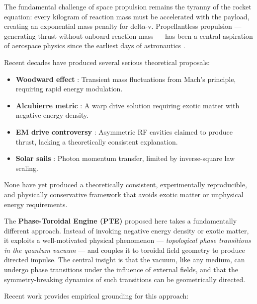 \documentclass[12pt,a4paper]{article}
\begin{document}
The fundamental challenge of space propulsion remains the tyranny of the rocket equation: every kilogram of reaction mass must be accelerated with the payload, creating an exponential mass penalty for delta-v. Propellantless propulsion --- generating thrust without onboard reaction mass --- has been a central aspiration of aerospace physics since the earliest days of astronautics \cite{tsiolkovsky1903, goddard1919}.

Recent decades have produced several serious theoretical proposals:

\begin{itemize}
    \item \textbf{Woodward effect} \cite{woodward1990}: Transient mass fluctuations from Mach's principle, requiring rapid energy modulation.
    \item \textbf{Alcubierre metric} \cite{alcubierre1994}: A warp drive solution requiring exotic matter with negative energy density.
    \item \textbf{EM drive controversy} \cite{shawyer2008,white2021}: Asymmetric RF cavities claimed to produce thrust, lacking a theoretically consistent explanation.
    \item \textbf{Solar sails} \cite{mcinnes2004}: Photon momentum transfer, limited by inverse-square law scaling.
\end{itemize}

None have yet produced a theoretically consistent, experimentally reproducible, and physically conservative framework that avoids exotic matter or unphysical energy requirements.

The \textbf{Phase-Toroidal Engine (PTE)} proposed here takes a fundamentally different approach. Instead of invoking negative energy density or exotic matter, it exploits a well-motivated physical phenomenon --- \emph{topological phase transitions in the quantum vacuum} --- and couples it to toroidal field geometry to produce directed impulse. The central insight is that the vacuum, like any medium, can undergo phase transitions under the influence of external fields, and that the symmetry-breaking dynamics of such transitions can be geometrically directed.

Recent work provides empirical grounding for this approach:
\end{document}
